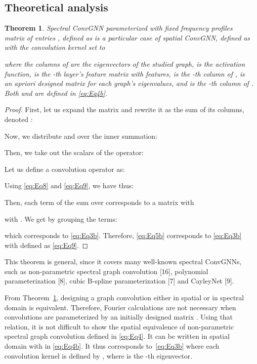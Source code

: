 \documentclass{article}
\newtheorem{theorem}{Theorem}
\begin{document}
\subsection{Theoretical analysis}


\begin{theorem}
  \label{Th:th1}
Spectral ConvGNN  parameterized with fixed frequency profiles matrix  of entries , defined as 
is a particular case of spatial ConvGNN, defined as 
with the convolution kernel set to

where the columns of  are the eigenvectors of the studied graph,  is the activation function,  is the -th layer's feature matrix with  features,  is the -th column of ,   is an apriori designed matrix for each graph's
eigenvalues, and  is the -th column of . Both  and  are defined in \eqref{eq:Eq4b}. 
\end{theorem}

\begin{proof}
First, let us expand the matrix  and rewrite it as the sum of its columns, denoted :

Now, we distribute  and  over the inner summation: 

Then, we take out the scalars  of the  operator:

Let us define a convolution operator  as:

Using \eqref{eq:Eq8} and \eqref{eq:Eq9}, we have thus:

Then, each term of the sum over  corresponds to  a matrix  with

with 
. 
We get by grouping the terms:

which corresponds to \eqref{eq:Eq3b}.
Therefore, \eqref{eq:Eq5b} corresponds to \eqref{eq:Eq3b} with  defined as \eqref{eq:Eq9}.
\end{proof}

This theorem is general, since it covers many well-known spectral ConvGNNs, such as non-parametric spectral graph convolution [16], polynomial parameterization [8], cubic B-spline parameterization [7] and CayleyNet [9].

From Theorem~\ref{Th:th1}, designing a graph convolution either in spatial or in spectral domain is equivalent. Therefore, Fourier calculations are not necessary when convolutions are parameterized by an initially designed matrix . 
Using that relation, it is not difficult to show the spatial equivalence of non-parametric spectral graph convolution defined in \eqref{eq:Eq4}. It can be written in spatial domain with  in \eqref{eq:Eq4b}. It thus corresponds to~\eqref{eq:Eq3b} where each convolution kernel is defined by , where  is the -th eigenvector. 
\end{document}
